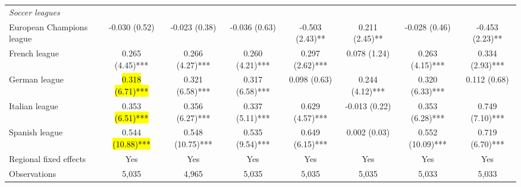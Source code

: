 \documentclass[11pt]{article}
\begin{document}
\begin{table}[h]
{\begin{tabular}{l c c c c c c c}
\emph{Soccer leagues} \\
European Champions league & -0.030 (0.52) & -0.023 (0.38) & -0.036 (0.63) & -0.503 (2.43)** & 0.211 (2.45)** & -0.028 (0.46) & -0.453 (2.23)** \\
French league & 0.265 (4.45)*** & 0.266 (4.27)*** & 0.260 (4.21)*** & 0.297 (2.62)*** & 0.078 (1.24) & 0.263 (4.15)*** & 0.334 (2.93)*** \\
German league & \hl{0.318 (6.71)***} & 0.321 (6.58)*** & 0.317 (6.58)*** & 0.098 (0.63) & 0.244 (4.12)*** & 0.320 (6.33)*** & 0.112 (0.68) \\
Italian league & 0.353 \hl{(6.51)***} & 0.356 (6.27)*** & 0.337 (5.11)*** & 0.629 (4.57)*** & -0.013 (0.22) & 0.353 (6.28)*** & 0.749 (7.10)*** \\
Spanish league & 0.544 \hl{(10.88)***} & 0.548 (10.75)*** & 0.535 (9.54)*** & 0.649 (6.15)*** & 0.002 (0.03) & 0.552 (10.09)*** & 0.719 (6.70)*** \\
Regional fixed effects & Yes & Yes & Yes & Yes & Yes & Yes & Yes \\
Observations & 5,035 & 4,965 & 5,035 & 5,035 & 5,035 & 5,033 & 5,033 \\
\hline
\end{tabular}}
\label{table:nonlin} 
\end{table}


	
\end{document}
